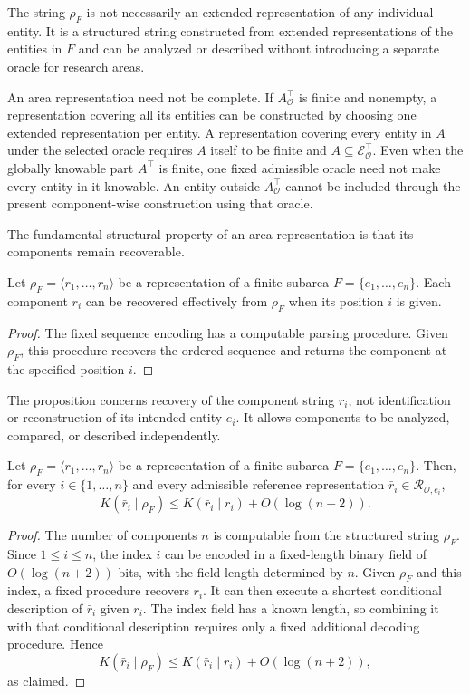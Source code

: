 The string $\rho_F$ is not necessarily an extended representation of any individual entity. It is a structured string constructed from extended representations of the entities in $F$ and can be analyzed or described without introducing a separate oracle for research areas.

An area representation need not be complete. If $A^\top_{\mathcal O}$ is finite and nonempty, a representation covering all its entities can be constructed by choosing one extended representation per entity. A representation covering every entity in $A$ under the selected oracle requires $A$ itself to be finite and $A\subseteq\mathcal E^\top_{\mathcal O}$. Even when the globally knowable part $A^\top$ is finite, one fixed admissible oracle need not make every entity in it knowable. An entity outside $A^\top_{\mathcal O}$ cannot be included through the present component-wise construction using that oracle.

The fundamental structural property of an area representation is that its components remain recoverable.

\begin{proposition}
Let $\rho_F=\langle r_1,\ldots,r_n\rangle$ be a representation of a finite subarea $F=\{e_1,\ldots,e_n\}$. Each component $r_i$ can be recovered effectively from $\rho_F$ when its position $i$ is given.
\end{proposition}
\begin{proof}
The fixed sequence encoding has a computable parsing procedure. Given $\rho_F$, this procedure recovers the ordered sequence and returns the component at the specified position $i$.
\end{proof}

The proposition concerns recovery of the component string $r_i$, not identification or reconstruction of its intended entity $e_i$. It allows components to be analyzed, compared, or described independently.

\begin{proposition}
Let $\rho_F=\langle r_1,\ldots,r_n\rangle$ be a representation of a finite subarea $F=\{e_1,\ldots,e_n\}$. Then, for every $i\in\{1,\ldots,n\}$ and every admissible reference representation $\bar r_i\in\bar{\mathcal R}_{\mathcal O,e_i}$,
\[
K(\bar r_i\mid\rho_F)
\leq K(\bar r_i\mid r_i)+O(\log(n+2)).
\]
\end{proposition}
\begin{proof}
The number of components $n$ is computable from the structured string $\rho_F$. Since $1\leq i\leq n$, the index $i$ can be encoded in a fixed-length binary field of $O(\log(n+2))$ bits, with the field length determined by $n$. Given $\rho_F$ and this index, a fixed procedure recovers $r_i$. It can then execute a shortest conditional description of $\bar r_i$ given $r_i$. The index field has a known length, so combining it with that conditional description requires only a fixed additional decoding procedure. Hence
\[
K(\bar r_i\mid\rho_F)
\leq K(\bar r_i\mid r_i)+O(\log(n+2)),
\]
as claimed.
\end{proof}

